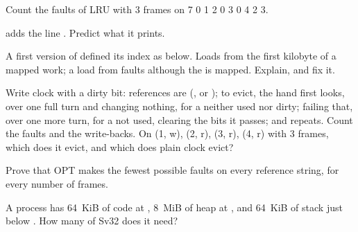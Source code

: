 \begin{exercise}[$\star$]\label{exo:b3:virtual-memory:3}
Count the faults of LRU with 3 frames on 7 0 1 2 0 3 0 4 2 3.
\end{exercise}

\begin{exercise}[$\star$]\label{exo:b3:virtual-memory:4}
 adds the line . Predict what it prints.
\end{exercise}

\begin{exercise}[$\star\star$]\label{exo:b3:virtual-memory:5}
A first version of  defined its index as below. Loads from the first kilobyte of a mapped  work; a load from  faults although the   is mapped. Explain, and fix it.

\label{lst:b3:virtual-memory:vpnbug}
\end{exercise}

\begin{exercise}[$\star\star$]\label{exo:b3:virtual-memory:6}
Write clock with a dirty bit: references are (,  or ); to evict, the hand first looks, over one full turn and changing nothing, for a  neither used nor dirty; failing that, over one more turn, for a  not used, clearing the bits it passes; and repeats. Count the faults and the write-backs. On (1, w), (2, r), (3, r), (4, r) with 3 frames, which  does it evict, and which does plain clock evict?
\end{exercise}

\begin{exercise}[$\star\star$]\label{exo:b3:virtual-memory:7}
Prove that OPT makes the fewest possible faults on every reference string, for every number of frames.
\end{exercise}

\begin{exercise}[$\star\star$]\label{exo:b3:virtual-memory:8}
A process has 64~KiB of code at , 8~MiB of heap at , and 64~KiB of stack just below . How many  of Sv32  does it need?
\end{exercise}

